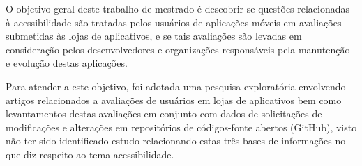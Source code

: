 

O objetivo geral deste trabalho de mestrado é descobrir se questões relacionadas à acessibilidade são tratadas pelos usuários de aplicações móveis em avaliações submetidas às lojas de aplicativos,
e se tais avaliações são levadas em consideração pelos desenvolvedores e organizações responsáveis pela manutenção e evolução destas aplicações.


Para atender a este objetivo, foi adotada uma pesquisa exploratória envolvendo artigos relacionados a avaliações de usuários em lojas de aplicativos bem como levantamentos destas avaliações em conjunto com dados de solicitações de modificações e alterações em repositórios de códigos-fonte abertos (GitHub), visto não ter sido identificado estudo relacionando estas três bases de informações no que diz respeito ao tema acessibilidade.







